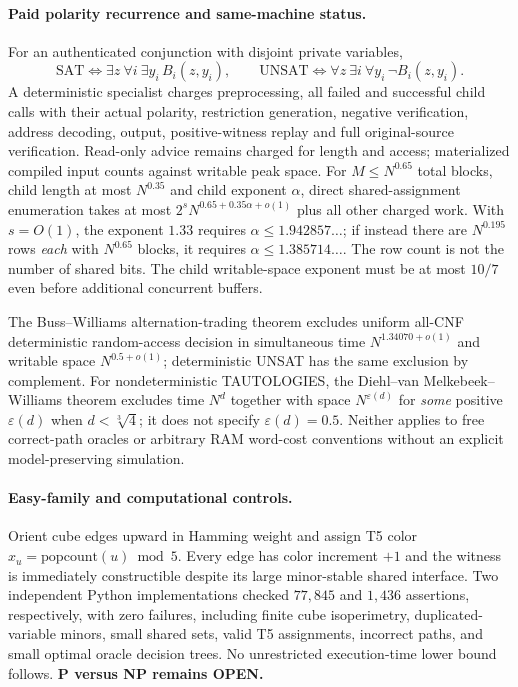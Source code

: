 \documentclass[11pt]{article}
\begin{document}
\paragraph{Paid polarity recurrence and same-machine status.}
For an authenticated conjunction with disjoint private variables,
\[
\mathrm{SAT}\iff\exists z\ \forall i\ \exists y_i\,B_i(z,y_i),
\qquad
\mathrm{UNSAT}\iff\forall z\ \exists i\ \forall y_i\,\neg B_i(z,y_i).
\]
A deterministic specialist charges preprocessing,
all failed and successful child calls with their actual
polarity, restriction generation, negative verification,
address decoding, output, positive-witness replay and full
original-source verification. Read-only advice remains
charged for length and access; materialized compiled input
counts against writable peak space.
For $M\le N^{0.65}$ total blocks, child length at most
$N^{0.35}$ and child exponent $\alpha$, direct shared-assignment
enumeration takes at most
$2^sN^{0.65+0.35\alpha+o(1)}$ plus all other charged work.
With $s=O(1)$, the exponent $1.33$ requires
$\alpha\le 1.942857\ldots$; if instead there are
$N^{0.195}$ rows \emph{each} with $N^{0.65}$ blocks,
it requires $\alpha\le 1.385714\ldots$.
The row count is not the number of shared bits.
The child writable-space exponent must be at most $10/7$
even before additional concurrent buffers.

The Buss--Williams alternation-trading theorem excludes
uniform all-CNF deterministic random-access decision
in simultaneous time $N^{1.34070+o(1)}$ and writable
space $N^{0.5+o(1)}$; deterministic UNSAT has the same
exclusion by complement.
For nondeterministic TAUTOLOGIES, the Diehl--van Melkebeek--Williams
theorem excludes time $N^{d}$ together with
space $N^{\varepsilon(d)}$ for \emph{some} positive
$\varepsilon(d)$ when $d<\sqrt[3]{4}$; it does not specify
$\varepsilon(d)=0.5$. Neither applies to free correct-path
oracles or arbitrary RAM word-cost conventions without
an explicit model-preserving simulation.

\paragraph{Easy-family and computational controls.}
Orient cube edges upward in Hamming weight and assign T5
color $x_u=\mathrm{popcount}(u)\bmod 5$. Every edge has
color increment $+1$ and the witness is immediately
constructible despite its large minor-stable shared interface.
Two independent Python implementations checked $77{,}845$
and $1{,}436$ assertions, respectively, with zero failures,
including finite cube isoperimetry, duplicated-variable minors,
small shared sets, valid T5 assignments, incorrect paths, and
small optimal oracle decision trees.
No unrestricted execution-time lower bound follows.
\textbf{P versus NP remains OPEN.}
\end{document}

